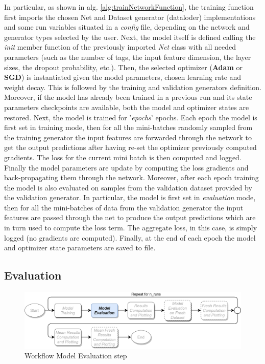 \documentclass[pdfa%
,cucitura%
]{toptesi}
\begin{document}
In particular, as shown in alg. \ref{alg:trainNetworkFunction}, the training function first imports the chosen Net and Dataset generator (dataloder) implementations and some run variables situated in a \textit{config} file, depending on the network and generator types selected by the user. Next, the model itself is defined calling the \textit{init} member function of the previously imported \textit{Net} class with all needed parameters (such as the number of tags, the input feature dimension, the layer sizes, the dropout probability, etc.). Then, the selected optimizer (\textbf{Adam} or \textbf{SGD}) is instantiated given the model parameters, chosen learning rate and weight decay. This is followed by the training and validation generators definition. Moreover, if the model has already been trained in a previous run and its state parameters checkpoints are available, both the model and optimizer states are restored. Next, the model is trained for '\textit{epochs}' epochs. Each epoch the model is first set in training mode, then for all the mini-batches randomly sampled from the training generator the input features are forwarded through the network to get the output predictions after having re-set the optimizer previously computed gradients. The loss for the current mini batch is then computed and logged. Finally the model parameters are update by computing the loss gradients and back-propagating them through the network. Moreover, after each epoch training the model is also evaluated on samples from the validation dataset provided by the validation generator. In particular, the model is first set in \textit{evaluation} mode, then for all the mini-batches of data from the validation generator the input features are passed through the net to produce the output predictions which are in turn used to compute the loss term. The aggregate loss, in this case, is simply logged (no gradients are computed). Finally, at the end of each epoch the model and optimizer state parameters are saved to file.

\subsection{Evaluation}
\begin{figure}[h!]
	\centering
	\includegraphics[width=\textwidth]{./images/workflow_eval.png}
	\caption[Evaluation workflow step]{Workflow Model Evaluation step}
	\label{fig:workflow_eval}
\end{figure}
\end{document}
